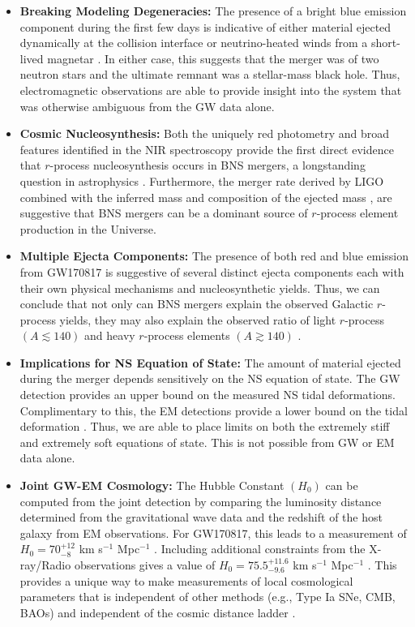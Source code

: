 \begin{itemize}
\item {\bf Breaking Modeling Degeneracies:} The presence of a bright blue emission component during the first few days is indicative of either material ejected dynamically at the collision interface \citep{Nicholl+17a} or neutrino-heated winds from a short-lived magnetar \citep{Metzger+18}. In either case, this suggests that the merger was of two neutron stars and the ultimate remnant was a stellar-mass black hole. Thus, electromagnetic observations are able to provide insight into the system that was otherwise ambiguous from the GW data alone.
\item {\bf Cosmic Nucleosynthesis:} Both the uniquely red photometry \citep{Cowp+17} and broad features identified in the NIR spectroscopy \citep{Chornock+17} provide the first direct evidence that $r$-process nucleosynthesis occurs in BNS mergers, a longstanding question in astrophysics \citep{LattimerSchramm74,Lattimer+77}. Furthermore, the merger rate derived by LIGO \citep{LIGOGW170817} combined with the inferred mass and composition of the ejected mass \citep{Cowp+17,Villar+17b}, are suggestive that BNS mergers can be a dominant source of $r$-process element production in the Universe.
\item {\bf Multiple Ejecta Components:} The presence of both red and blue emission from GW170817 is suggestive of several distinct ejecta components each with their own physical mechanisms and nucleosynthetic yields. Thus, we can conclude that not only can BNS mergers explain the observed Galactic $r$-process yields, they may also explain the observed ratio of light $r$-process $(A \lesssim 140)$ and heavy $r$-process elements $(A \gtrsim 140)$ \citep{Cowp+17,Kasen+17}.
\item {\bf Implications for NS Equation of State:} The amount of material ejected during the merger depends sensitively on the NS equation of state. The GW detection provides an upper bound on the measured NS tidal deformations. Complimentary to this, the EM detections provide a lower bound on the tidal deformation \citep{Radice+18}. Thus, we are able to place limits on both the extremely stiff and extremely soft equations of state. This is not possible from GW or EM data alone.
\item {\bf Joint GW-EM Cosmology:} The Hubble Constant $(H_0)$ can be computed from the joint detection by comparing the luminosity distance determined from the gravitational wave data and the redshift of the host galaxy from EM observations. For GW170817, this leads to a measurement of $H_0 = 70^{+12}_{-8}$ km s$^{-1}$ Mpc$^{-1}$ \citep{LIGOH0}. Including additional constraints from the X-ray/Radio observations gives a value of $H_0 = 75.5^{+11.6}_{-9.6}$ km s$^{-1}$ Mpc$^{-1}$ \citep{Guidorzi+17}. This provides a unique way to make measurements of local cosmological parameters that is independent of other methods (e.g., Type Ia SNe, CMB, BAOs) and independent of the cosmic distance ladder \citep{Schutz1986,HolzHughes05}.
\end{itemize}


